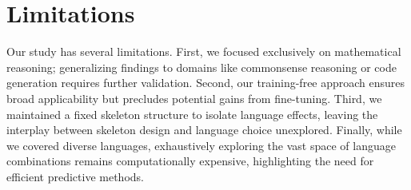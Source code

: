 \section*{Limitations}
Our study has several limitations. First, we focused exclusively on mathematical reasoning; generalizing findings to domains like commonsense reasoning or code generation requires further validation. Second, our training-free approach ensures broad applicability but precludes potential gains from fine-tuning. Third, we maintained a fixed skeleton structure to isolate language effects, leaving the interplay between skeleton design and language choice unexplored. Finally, while we covered diverse languages, exhaustively exploring the vast space of language combinations remains computationally expensive, highlighting the need for efficient predictive methods.
